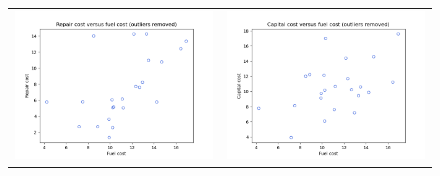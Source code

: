 \begin{enumerate}[label= (\alph*)]
\begin{figure}[H]
\begin{tabular}{cc}
        \end{tabular}
    \end{figure}

    \begin{figure}[H]
        \centering
        \begin{tabular}{cc}
            \includegraphics[scale=0.30]{./python/chapter-5/Question-5-22-a-xy-FuelRepair-del.png} &
            \includegraphics[scale=0.30]{./python/chapter-5/Question-5-22-a-xy-FuelCapital-del.png} \\

\end{tabular}
\end{figure}
\end{enumerate}
